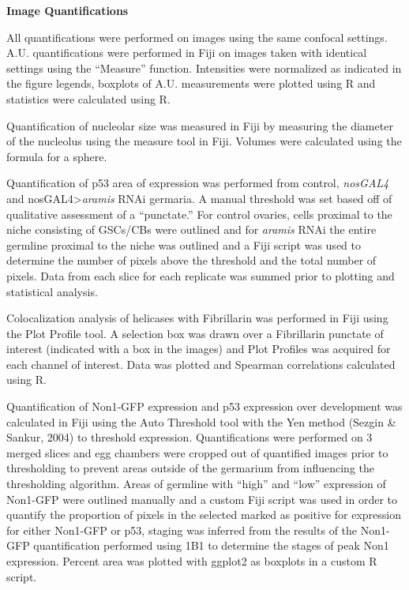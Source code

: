 \documentclass[12pt,oneside]{reedthesis}
\begin{document}
\textbf{Image Quantifications}

All quantifications were performed on images using the same confocal
settings. A.U. quantifications were performed in Fiji on images taken
with identical settings using the ``Measure'' function. Intensities were
normalized as indicated in the figure legends, boxplots of A.U.
measurements were plotted using R and statistics were calculated using
R.

Quantification of nucleolar size was measured in Fiji by measuring the
diameter of the nucleolus using the measure tool in Fiji. Volumes were
calculated using the formula for a sphere.

Quantification of p53 area of expression was performed from control,
\emph{nosGAL4} and nosGAL4\textgreater{}\emph{aramis} RNAi germaria. A manual threshold was
set based off of qualitative assessment of a ``punctate.'' For control
ovaries, cells proximal to the niche consisting of GSCs/CBs were
outlined and for \emph{aramis} RNAi the entire germline proximal to the niche
was outlined and a Fiji script was used to determine the number of
pixels above the threshold and the total number of pixels. Data from
each slice for each replicate was summed prior to plotting and
statistical analysis.

Colocalization analysis of helicases with Fibrillarin was performed in
Fiji using the Plot Profile tool. A selection box was drawn over a
Fibrillarin punctate of interest (indicated with a box in the images)
and Plot Profiles was acquired for each channel of interest. Data was
plotted and Spearman correlations calculated using R.

Quantification of Non1-GFP expression and p53 expression over
development was calculated in Fiji using the Auto Threshold tool with
the Yen method (Sezgin \& Sankur, 2004) to threshold
expression. Quantifications were performed on 3 merged slices and egg
chambers were cropped out of quantified images prior to thresholding to
prevent areas outside of the germarium from influencing the thresholding
algorithm. Areas of germline with ``high'' and ``low'' expression of
Non1-GFP were outlined manually and a custom Fiji script was used in
order to quantify the proportion of pixels in the selected marked as
positive for expression for either Non1-GFP or p53, staging was inferred
from the results of the Non1-GFP quantification performed using 1B1 to
determine the stages of peak Non1 expression. Percent area was plotted
with ggplot2 as boxplots in a custom R script.
\end{document}
